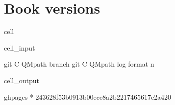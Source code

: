 \documentclass[letterpaper,table,10pt,english]{jupyterBook}
\begin{document}
\section{Book versions}
\label{\detokenize{tests/build_versions_checks:book-versions}}
\begin{sphinxuseclass}{cell}\begin{sphinxVerbatimInput}

\begin{sphinxuseclass}{cell_input}
\begin{sphinxVerbatim}[commandchars=\\\{\}]
  
git \PYGZhy{}C QMpath branch
git \PYGZhy{}C QMpath log \PYGZhy{}\PYGZhy{}format \PYGZhy{}n 
\end{sphinxVerbatim}

\end{sphinxuseclass}\end{sphinxVerbatimInput}
\begin{sphinxVerbatimOutput}

\begin{sphinxuseclass}{cell_output}
\begin{sphinxVerbatim}[commandchars=\\\{\}]
  gh\PYGZhy{}pages
* 
243628f53b0913b00ece8a2b2217465617c2a420
\end{sphinxVerbatim}

\end{sphinxuseclass}\end{sphinxVerbatimOutput}

\end{sphinxuseclass}
\end{document}

